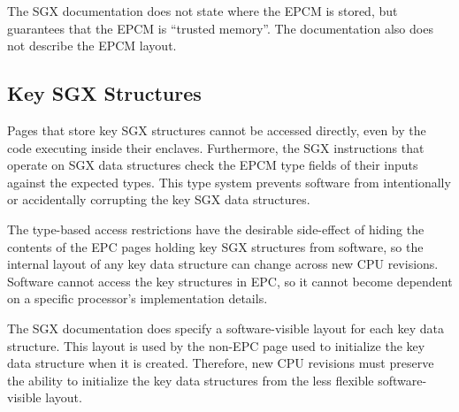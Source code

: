 The SGX documentation does not state where the EPCM is stored, but guarantees
that the EPCM is ``trusted memory''. The documentation also does not describe
the EPCM layout.



\subsection{Key SGX Structures}
\label{sec:key_structures}


Pages that store key SGX structures cannot be accessed directly, even by the
code executing inside their enclaves. Furthermore, the SGX instructions that
operate on SGX data structures check the EPCM type fields of their inputs
against the expected types. This type system prevents software from
intentionally or accidentally corrupting the key SGX data structures.

The type-based access restrictions have the desirable side-effect of hiding the
contents of the EPC pages holding key SGX structures from software, so the
internal layout of any key data structure can change across new CPU revisions.
Software cannot access the key structures in EPC, so it cannot become dependent
on a specific processor's implementation details.

The SGX documentation does specify a software-visible layout for each key data
structure. This layout is used by the non-EPC page used to initialize the key
data structure when it is created. Therefore, new CPU revisions must preserve
the ability to initialize the key data structures from the less flexible
software-visible layout.


